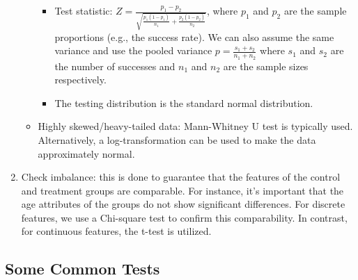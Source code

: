 \begin{enumerate}
\begin{itemize}
                            \begin{itemize}
                                \item Test statistic: $Z = \frac{p_1 - p_2}{\sqrt{\frac{p_1(1-p_1)}{n_1} + \frac{p_2(1-p_2)}{n_2}} }$, where $p_1$ and $p_2$ are the sample proportions (e.g., the success rate).
                                We can also assume the same variance and use the pooled variance $p = \frac{s_1 + s_2}{n_1+n_2}$ where $s_1$ and $s_2$ are the number of successes and $n_1$ and $n_2$ are the sample sizes respectively. 
                                \item The testing distribution is the standard normal distribution. 
                            \end{itemize}
                        \item Highly skewed/heavy-tailed data: Mann-Whitney U test is typically used. Alternatively, a log-transformation can be used to make the data approximately normal. 
                    \end{itemize}
                \item Check imbalance: this is done to guarantee that the features of the control and treatment groups are comparable. For instance, it's important that the age attributes of the groups do not show significant differences. For discrete features, we use a Chi-square test to confirm this comparability. In contrast, for continuous features, the t-test is utilized.
            \end{enumerate}
    
    
    \subsection{Some Common Tests}
        
